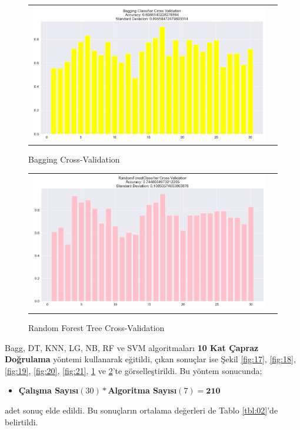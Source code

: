 \documentclass[conference]{IEEEtran}
\begin{document}
\begin{figure}[!h]
	\centering
	\begin{center}
		\begin{tabular}{cc}
			\includegraphics[scale=0.225]{pictures/pic_22.png}&
		\end{tabular}
	\end{center}
	\caption{Bagging Cross-Validation}
	\label{fig:22}
\end{figure}
\pagebreak
\begin{figure}[!h]
	\centering
	\begin{center}
		\begin{tabular}{cc}
			\includegraphics[scale=0.225]{pictures/pic_23.png}&
		\end{tabular}
	\end{center}
	\caption{Random Forest Tree Cross-Validation}
	\label{fig:23}
\end{figure}

\quad Bagg, DT, KNN, LG, NB, RF ve SVM algoritmaları \textbf{10 Kat Çapraz Doğrulama} yöntemi kullanarak eğitildi, çıkan sonuçlar ise Şekil \ref{fig:17}, \ref{fig:18}, \ref{fig:19}, \ref{fig:20}, \ref{fig:21}, \ref{fig:22} ve \ref{fig:23}'te görselleştirildi. Bu yöntem sonucunda;
\begin{itemize}
\item \textbf{Çalışma Sayısı}$(30) * $\textbf{Algoritma Sayısı}$(7) = \textbf{210}$
\end{itemize}
adet sonuç elde edildi. Bu sonuçların ortalama değerleri de Tablo \ref{tbl:02}'de belirtildi.
\end{document}
